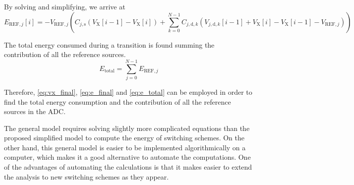 \documentclass[]{article}
\newcommand{\vref}{\ensuremath{V_\mathrm{REF}}}
\begin{document}

By solving and simplifying, we arrive at 
\begin{equation}
	E_{\mathrm{REF},j}[i] = 
	- V_{\mathrm{REF},j} \left( C_{j,\mathrm{s}} \left(V_\mathrm{X}[i-1]-V_\mathrm{X}[i]\right) + 
	\sum\limits_{k=0}^{N-1}C_{j,\mathrm{d},k} \left( V_{j,\mathrm{d},k}[i-1] + V_\mathrm{X}[i]- V_\mathrm{X}[i-1] -V_{\mathrm{REF},j} \right)
	\right)
	\label{eq:e_final}
\end{equation}

The total energy consumed during a transition is found summing the contribution of all the reference sources.
\begin{equation}
	E_\mathrm{total}=\sum\limits_{j=0}^{N-1}E_{\mathrm{REF},j}
	\label{eq:e_total}
\end{equation}

Therefore, \eqref{eq:vx_final}, \eqref{eq:e_final} and \eqref{eq:e_total} can be employed in order to find the total energy consumption and the contribution of all the reference sources in the ADC.  

The general model requires solving slightly more complicated equations than the proposed simplified model to compute the energy of switching schemes. On the other hand, this general model is easier to be implemented algorithmically on a computer, which makes it a good alternative to automate the computations. One of the advantages of automating the calculations is that it makes easier to extend the analysis to new switching schemes as they appear.
\end{document}
